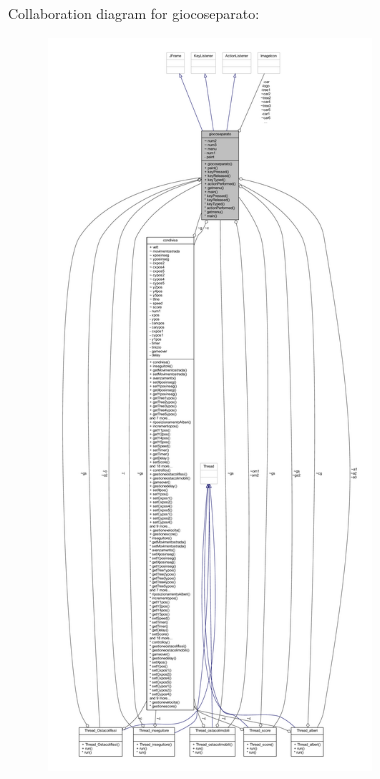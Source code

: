 Collaboration diagram for giocoseparato\+:
\nopagebreak
\begin{figure}[H]
\begin{center}
\leavevmode
\includegraphics[height=550pt]{classcargame_1_1giocoseparato__coll__graph}
\end{center}
\end{figure}
